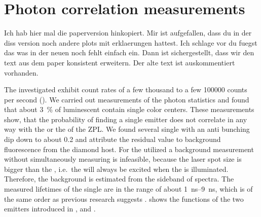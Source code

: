 %
%


	\section{Photon correlation measurements} \label{subsec::g2}

		\begin{remark}

			Ich hab hier mal die paperversion hinkopiert. Mir ist aufgefallen, dass du in der diss version noch andere plots mit erklaerungen hattest. Ich schlage vor du fuegst das was in der neuen noch fehlt einfach ein. Dann ist sichergestellt, dass wir den text aus dem paper konsistent erweitern. Der alte text ist auskommentiert vorhanden.

		\end{remark}

		The investigated \sivs exhibit count rates of a few thousand to a few \num{100000} counts per second (\SI{}{\cps}).
		We carried out measurements of the photon statistics and found that about \SI{3}{\percent} of luminescent \nds contain single color centers.
		These measurements show, that the probability of finding a single emitter does not correlate in any way with the \cwl or the \lw of the ZPL.
		We found several single \sivs with an anti bunching dip down to about \num{0.2} and attribute the residual \gtz value to background fluorescence from the diamond host.
		For the utilized \nds a background measurement without simultaneously measuring \siv \pl is infeasible, because the laser spot size is bigger than the \nd, i.e.\ the \siv will always be excited when the \nd is illuminated.
		Therefore, the background is estimated from the sideband of \siv spectra.
		The measured lifetimes of the single \sivs are in the range of about \SIrange{1}{9}{\ns}, which is of the same order as previous research suggests \cite{Sipahigil2014,Sternschulte1994}.
		 shows the \gt functions of the two emitters introduced in , \emnarrow and \embroad.

